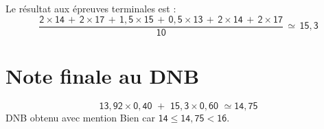 \documentclass[11pt,a5paper]{article}
\begin{document}
Le résultat aux épreuves terminales est :
\[\mathsf{
	\dfrac{
		2 \times 14 \, + \, 2 \times 17 \, + \, 1,5 \times 15 \, + \, 0,5 \times 13 \, + \, 2 \times 14 \, + \, 2 \times 17
	}{10} \, \simeq \, 15,3
}\]

\vspace{1.3em}
\section*{Note finale au DNB}
\vspace{-1em}
\[ \mathsf{13,92 \times 0,40 \,\, + \,\, 15,3 \times 0,60 \,\, \simeq 14,75 }\]
\vspace{0,4em}
DNB obtenu avec mention Bien car $\mathsf{14 \leq 14,75 < 16}$.
\end{document}
